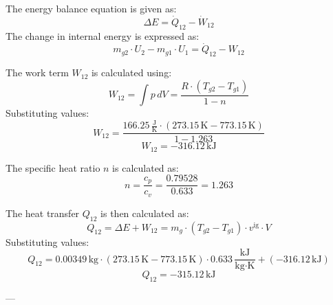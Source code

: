 The energy balance equation is given as:  
\[
\Delta E = \dot{Q}_{12} - \dot{W}_{12}
\]  
The change in internal energy is expressed as:  
\[
m_{g2} \cdot U_2 - m_{g1} \cdot U_1 = \dot{Q}_{12} - W_{12}
\]  

The work term \( W_{12} \) is calculated using:  
\[
W_{12} = \int p \, dV = \frac{R \cdot (T_{g2} - T_{g1})}{1 - n}
\]  
Substituting values:  
\[
W_{12} = \frac{166.25 \, \frac{\text{J}}{\text{K}} \cdot (273.15 \, \text{K} - 773.15 \, \text{K})}{1 - 1.263}
\]  
\[
W_{12} = -316.12 \, \text{kJ}
\]  

The specific heat ratio \( n \) is calculated as:  
\[
n = \frac{c_p}{c_v} = \frac{0.79528}{0.633} = 1.263
\]  

The heat transfer \( Q_{12} \) is then calculated as:  
\[
Q_{12} = \Delta E + W_{12} = m_g \cdot (T_{g2} - T_{g1}) \cdot v^{\text{ig}} \cdot V
\]  
Substituting values:  
\[
Q_{12} = 0.00349 \, \text{kg} \cdot (273.15 \, \text{K} - 773.15 \, \text{K}) \cdot 0.633 \, \frac{\text{kJ}}{\text{kg·K}} + (-316.12 \, \text{kJ})
\]  
\[
Q_{12} = -315.12 \, \text{kJ}
\]  

---